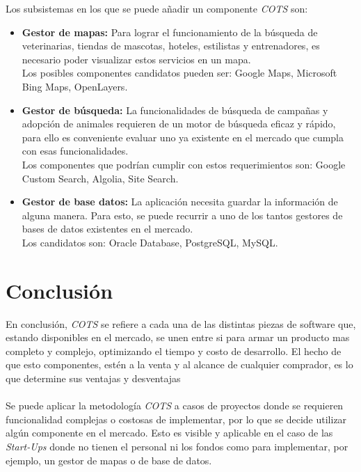\documentclass{udpreport}
\begin{document}
Los subsistemas en los que se puede añadir un componente \emph{COTS} son:
\begin{itemize}
    \item \textbf{Gestor de mapas:} Para lograr el funcionamiento de la búsqueda de veterinarias, tiendas de mascotas, hoteles, estilistas y entrenadores, es necesario poder visualizar estos servicios en un mapa.\\
    Los posibles componentes candidatos pueden ser: Google Maps, Microsoft Bing Maps, OpenLayers.
    
    \item \textbf{Gestor de búsqueda:} La funcionalidades de búsqueda de campañas y adopción de animales requieren de un motor de búsqueda eficaz y rápido, para ello es conveniente evaluar uno ya existente en el mercado que cumpla con esas funcionalidades.\\
    Los componentes que podrían cumplir con estos requerimientos son: Google Custom Search, Algolia, Site Search.
    
    \item \textbf{Gestor de base datos:} La aplicación necesita guardar la información de alguna manera. Para esto, se puede recurrir a uno de los tantos gestores de bases de datos existentes en el mercado.\\
    Los candidatos son: Oracle Database, PostgreSQL, MySQL.
\end{itemize}

\chapter{Conclusión}

En conclusión, \emph{COTS} se refiere a cada una de las distintas piezas de software que, estando disponibles en el mercado, se unen entre si para armar un producto mas completo y complejo, optimizando el tiempo y costo de desarrollo. El hecho de que esto componentes, estén a la venta y al alcance de cualquier comprador, es lo que determine sus ventajas y desventajas 
\\\\
Se puede aplicar la metodología \emph{COTS} a casos de proyectos donde se requieren funcionalidad complejas o costosas de implementar, por lo que se decide utilizar algún componente en el mercado. Esto es visible y aplicable en el caso de las \emph{Start-Ups} donde no tienen el personal ni los fondos como para implementar, por ejemplo, un gestor de mapas o de base de datos. 

\nocite{*}
\printbibliography[title=Bibliografía]
\end{document}
